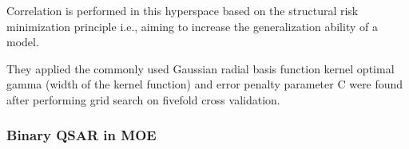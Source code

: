 Correlation is performed in this hyperspace based on the structural risk minimization principle i.e., aiming to increase the generalization ability of a model. \cite{Lapins2013}

They applied the commonly used Gaussian radial basis function kernel optimal gamma (width of the kernel function) and error penalty parameter C were found after performing grid search on five­fold cross validation. \cite{Lapins2013}

\subsubsection{Binary QSAR in MOE}



